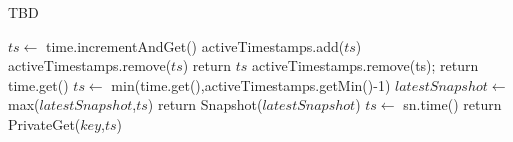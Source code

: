 \begin{algorithm} [th!]
\small
\caption{\small  TBD }
\label{alg:client}

\begin{algorithmic}[1]
\makeatletter\setcounter{ALG@line}{0}\makeatother

     \State $ts    \gets$ time.incrementAndGet() \label{beginNewTime}
      \State activeTimestamps.add($ts$)
        \State activeTimestamps.remove($ts$)
        \State {} 
      \EndIf
      \State return $ts$
\EndFunction
%
\vspace{7pt}
%
  \State activeTimestamps.remove(ts);
\EndFunction
\vspace{7pt}
%
  \State return time.get()
\EndFunction
\vspace{7pt}
    \State $ts    \gets$ min(time.get(),activeTimestamps.getMin()-1)
    \State $latestSnapshot \gets$ max($latestSnapshot$,$ts$) 
    \State return Snapshot($latestSnapshot$)
\EndFunction
\vspace{7pt}
    \State $ts    \gets$ sn.time()
    \State return PrivateGet($key$,$ts$)
\EndFunction
\end{algorithmic}
\end{algorithm}


